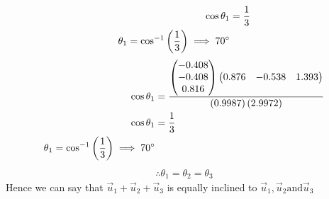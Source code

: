 \documentclass[11pt]{book}
\begin{document}
\begin{enumerate}
\begin{align}
    \cos{\theta_1}&=\frac{1}{3}\\
    \theta_1=\cos^{-1}\left(\frac{1}{3}\right)
    \implies 70\degree
\end{align}
\begin{align}
     \cos{\theta_1}&=\frac{\begin{pmatrix}-0.408 \\-0.408\\0.816\end{pmatrix}\begin{pmatrix}0.876&-0.538&1.393\end{pmatrix}}{\left(0.9987\right)\left(2.9972\right)}\\
    \cos{\theta_1}&=\frac{1}{3}\\
    \theta_1=\cos^{-1}\left(\frac{1}{3}\right)
    \implies 70\degree
\end{align}
\begin{align*}
    \therefore  \theta_1=\theta_2=\theta_3
\end{align*}
Hence  we can say that $\vec{u}_1+\vec{u}_2+\vec{u}_3 $ is equally inclined to $\vec{u}_1,\vec{u}_2 \text{and} \vec{u}_3  $ 
\end{enumerate}
\end{document}
